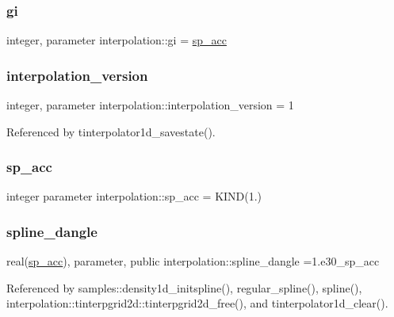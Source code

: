 \subsubsection{\texorpdfstring{gi}{gi}}
{\footnotesize\ttfamily integer, parameter interpolation\+::gi = \mbox{\hyperlink{namespaceinterpolation_af72aa9a05feb8ef90b2d26e4a013abf3}{sp\+\_\+acc}}}

\mbox{\label{namespaceinterpolation_a49ff5214fde353c8438a404922ce5989}} 
\subsubsection{\texorpdfstring{interpolation\+\_\+version}{interpolation\_version}}
{\footnotesize\ttfamily integer, parameter interpolation\+::interpolation\+\_\+version = 1}



Referenced by tinterpolator1d\+\_\+savestate().

\mbox{\label{namespaceinterpolation_af72aa9a05feb8ef90b2d26e4a013abf3}} 
\subsubsection{\texorpdfstring{sp\+\_\+acc}{sp\_acc}}
{\footnotesize\ttfamily integer parameter interpolation\+::sp\+\_\+acc = K\+I\+ND(1.)}

\mbox{\label{namespaceinterpolation_a3f75fda9aed3d08991097b0d7c8fc70f}} 
\subsubsection{\texorpdfstring{spline\+\_\+dangle}{spline\_dangle}}
{\footnotesize\ttfamily real(\mbox{\hyperlink{namespaceinterpolation_af72aa9a05feb8ef90b2d26e4a013abf3}{sp\+\_\+acc}}), parameter, public interpolation\+::spline\+\_\+dangle =1.e30\+\_\+sp\+\_\+acc}



Referenced by samples\+::density1d\+\_\+initspline(), regular\+\_\+spline(), spline(), interpolation\+::tinterpgrid2d\+::tinterpgrid2d\+\_\+free(), and tinterpolator1d\+\_\+clear().

